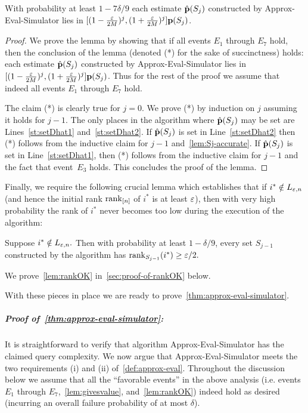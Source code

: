 \begin{lemma} \label{lem:hatD-Sj-good}
With probability at least $1 - 7\delta/9$ each estimate
$\hat{\mathbf{p}}(S_j)$ constructed by {\sc Approx-Eval-Simulator}
lies in $[(1 - {\frac {\varepsilon}{2M}})^{j},
(1+{\frac{\varepsilon}{2M}})^{j}] \mathbf{p}(S_j)$.
\end{lemma}
\begin{proof}
We prove the lemma by showing that if all events $E_1$ through $E_7$ hold, then
the conclusion of the lemma (denoted (*) for the sake of succinctness) holds:  each estimate
$\hat{\mathbf{p}}(S_j)$ constructed by {\sc Approx-Eval-Simulator}
lies in $[(1 - {\frac{\varepsilon}{2M}})^{j},
(1+ {\frac{\varepsilon}{2M}})^{j}] \mathbf{p}(S_j)$.  Thus for the rest of the proof we assume
that indeed all events $E_1$ through $E_7$ hold.

The claim (*) is clearly true for $j=0$.  We prove (*) by induction on $j$ assuming
it holds for $j-1.$
The only places in the algorithm where
$\hat{\mathbf{p}}(S_j)$ may be set are Lines~\ref{st:setDhat1} and~\ref{st:setDhat2}.
If $\hat{\mathbf{p}}(S_j)$  is set in Line~\ref{st:setDhat2} then
(*) follows from the inductive claim for $j-1$ and~\cref{lem:Sj-accurate}.  If
$\hat{\mathbf{p}}(S_j)$  is set in Line~\ref{st:setDhat1}, then (*) follows from
the inductive claim for $j-1$ and the fact that event~$E_{3}$ holds.  This concludes the
proof of the lemma.
\end{proof}


Finally, we require the following crucial lemma which establishes that
if $i^\ast \notin L_{\varepsilon,n}$ (and hence the initial rank
$\operatorname{rank}_{[n]}$ of $i^\ast$ is at least $\varepsilon$),
then with very high probability
the rank of $i^\ast$ never becomes too low
during the execution of the algorithm:

\begin{lemma} \label{lem:rankOK}
Suppose $i^\ast \notin L_{\varepsilon,n}.$  Then with probability at least
$1 - \delta/9$, every set $S_{j-1}$ constructed by the
algorithm has $\operatorname{rank}_{S_{j-1}}(i^\ast) \geq \varepsilon/2.$
\end{lemma}
We prove~\cref{lem:rankOK} in~\cref{sec:proof-of-rankOK} below.

With these pieces in place we are ready to prove~\cref{thm:approx-eval-simulator}.


\subparagraph{Proof of~\cref{thm:approx-eval-simulator}:}
It is straightforward to verify that algorithm
{\sc Approx-Eval-Simulator} has the claimed query complexity.  We now argue that {\sc Approx-Eval-Simulator}
meets the two requirements (i) and (ii) of~\cref{def:approx-eval}.  Throughout the
discussion below we assume that all the ``favorable events'' in the
above analysis (i.e. events $E_1$ through $E_7$,~\cref{lem:givesvalue},
and~\cref{lem:rankOK}) indeed hold as desired (incurring
an overall failure probability of at most $\delta$).

